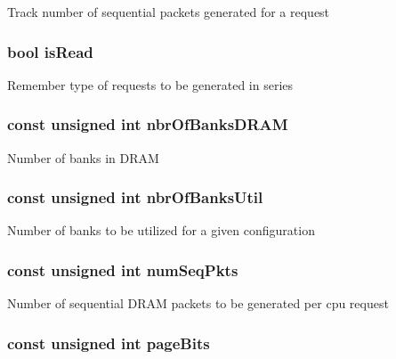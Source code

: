 \label{classDramGen_afe76fc6f68d7bc6df6e5757cbc74d949}
Track number of sequential packets generated for a request \hypertarget{classDramGen_a1ba0c9f9857ad696d8c3cd03de468fae}{
\subsubsection[{isRead}]{\setlength{\rightskip}{0pt plus 5cm}bool {\bf isRead}}}
\label{classDramGen_a1ba0c9f9857ad696d8c3cd03de468fae}
Remember type of requests to be generated in series \hypertarget{classDramGen_aad527c6f300f25a1ee8484deaba3d63c}{
\subsubsection[{nbrOfBanksDRAM}]{\setlength{\rightskip}{0pt plus 5cm}const unsigned int {\bf nbrOfBanksDRAM}}}
\label{classDramGen_aad527c6f300f25a1ee8484deaba3d63c}
Number of banks in DRAM \hypertarget{classDramGen_ad0a8571226776987fe09f08baf268a06}{
\subsubsection[{nbrOfBanksUtil}]{\setlength{\rightskip}{0pt plus 5cm}const unsigned int {\bf nbrOfBanksUtil}}}
\label{classDramGen_ad0a8571226776987fe09f08baf268a06}
Number of banks to be utilized for a given configuration \hypertarget{classDramGen_a3904e98c281ec13010eaf9fe0671cda4}{
\subsubsection[{numSeqPkts}]{\setlength{\rightskip}{0pt plus 5cm}const unsigned int {\bf numSeqPkts}}}
\label{classDramGen_a3904e98c281ec13010eaf9fe0671cda4}
Number of sequential DRAM packets to be generated per cpu request \hypertarget{classDramGen_a91979f75432119c425a60258ae2fae8f}{
\subsubsection[{pageBits}]{\setlength{\rightskip}{0pt plus 5cm}const unsigned int {\bf pageBits}}}
